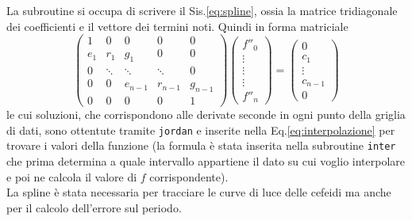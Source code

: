 \documentclass{article}
\numberwithin{equation}{subsection}
\begin{document}
La subroutine si occupa di scrivere il Sis.\ref{eq:spline}, ossia la matrice tridiagonale dei coefficienti e il vettore dei termini noti. Quindi in forma matriciale
\begin{equation}\label{eq:tridiagonal}
      \begin{pmatrix}
          1   &   0    &    0    &    0    &    0    \\
          e_1 &  r_1   &   g_1   &    0    &    0    \\
          0   & \ddots & \ddots  & \ddots  &    0    \\
           0  &    0   & e_{n-1} & r_{n-1} & g_{n-1} \\
           0  &   0    &    0    &    0    &    1
      \end{pmatrix} %
      \begin{pmatrix}
          f''_0 \\
          \vdots\\
          \vdots\\
          \vdots\\
          f''_n
      \end{pmatrix}=
      \begin{pmatrix}
          0      \\
          c_1    \\
          \vdots \\
          c_{n-1}\\
          0
      \end{pmatrix}
\end{equation}
le cui soluzioni, che corrispondono alle derivate seconde in ogni punto della griglia di dati, sono ottentute tramite \texttt{jordan} e inserite nella Eq.\ref{eq:interpolazione} per trovare i valori della funzione (la formula è stata inserita nella subroutine \texttt{inter} che prima determina a quale intervallo appartiene il dato su cui voglio interpolare e poi ne calcola il valore di $f$ corrispondente).\\
La spline è stata necessaria per tracciare le curve di luce delle cefeidi ma anche per il calcolo dell'errore sul periodo.
\end{document}
